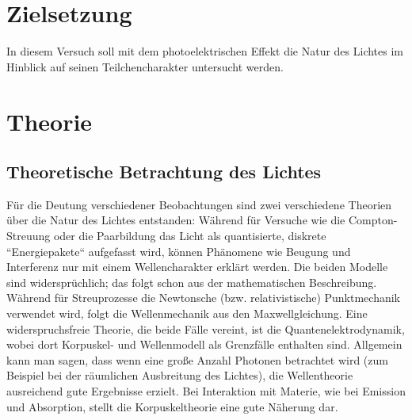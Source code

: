 \section*{Zielsetzung}
\label{sec:Zielsetzung}
In diesem Versuch soll mit dem photoelektrischen Effekt die Natur des Lichtes im Hinblick
auf seinen Teilchencharakter untersucht werden.

\section{Theorie}
\label{sec:Theorie}

\subsection{Theoretische Betrachtung des Lichtes}
\label{sec:Theoretische Betrachtung des Lichtes}
Für die Deutung verschiedener Beobachtungen sind zwei verschiedene Theorien über die Natur
des Lichtes entstanden: Während für Versuche wie die Compton-Streuung oder die Paarbildung
das Licht als quantisierte, diskrete ``Energiepakete`` aufgefasst wird, können Phänomene
wie Beugung und Interferenz nur mit einem Wellencharakter erklärt werden.
Die beiden Modelle sind widersprüchlich; das folgt schon aus der mathematischen
Beschreibung. Während für Streuprozesse die Newtonsche (bzw. relativistische) Punktmechanik
verwendet wird, folgt die Wellenmechanik aus den Maxwellgleichung.
Eine widerspruchsfreie Theorie, die beide Fälle vereint, ist die Quantenelektrodynamik,
wobei dort Korpuskel- und Wellenmodell als Grenzfälle enthalten sind. Allgemein kann man
sagen, dass wenn eine große Anzahl Photonen betrachtet wird (zum Beispiel bei der
räumlichen Ausbreitung des Lichtes), die Wellentheorie ausreichend gute Ergebnisse
erzielt. Bei Interaktion mit Materie, wie bei Emission und Absorption, stellt die
Korpuskeltheorie eine gute Näherung dar. 

